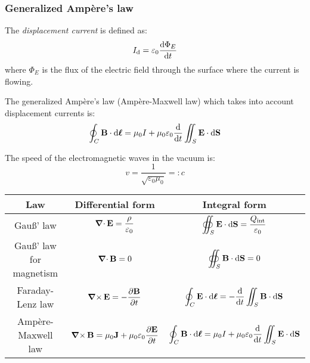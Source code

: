 \documentclass[../../../main_physics.tex]{subfiles}
\begin{document}
\begin{multicols}{2}
  \subsubsection{Generalized Ampère's law}
  \begin{definition}
    The \emph{displacement current} is defined as: $$I_\text{d}=\varepsilon_0\dv{\Phi_E}{t}$$ where $\Phi_E$ is the flux of the electric field through the surface where the current is flowing.
  \end{definition}
  \begin{law}
    The generalized Ampère's law (Ampère-Maxwell law) which takes into account displacement currents is: $$\oint_C\boldsymbol{\mathrm{B}}\cdot \dd{\boldsymbol{\mathrm{\ell}}}=\mu_0 I+\mu_0\varepsilon_0\dv{}{t}\iint_S\boldsymbol{\mathrm{E}}\cdot \dd{\boldsymbol{\mathrm{S}}}$$
  \end{law}
  \begin{definition}
    The speed of the electromagnetic waves in the vacuum is: $$v=\frac{1}{\sqrt{\varepsilon_0\mu_0}}=:c$$
  \end{definition}
\end{multicols}
\begin{table}[ht]
  \centering
  \renewcommand{\arraystretch}{2.5}
  \begin{tabular}{|c|c|c|}
    \hline
    \bfseries Law             & \bfseries Differential form                                                                 & \bfseries Integral form                                                                                            \\
    \hline
    Gau\ss' law               & $\displaystyle \operatorname{\boldsymbol{\mathrm{\nabla}}\cdot}\boldsymbol{\mathrm{E}}=\frac{\rho}{\varepsilon_0}$                                      & $\displaystyle \oiint_S\boldsymbol{\mathrm{E}}\cdot \dd{\boldsymbol{\mathrm{S}}}=\frac{Q_{\text{int}}}{\varepsilon_0}$                               \\
    \hline
    Gau\ss' law for magnetism & $\displaystyle \operatorname{\boldsymbol{\mathrm{\nabla}}\cdot}\boldsymbol{\mathrm{B}}=0$                                                               & $\displaystyle \oiint_S\boldsymbol{\mathrm{B}}\cdot \dd{\boldsymbol{\mathrm{S}}}=0$                                                                  \\
    \hline
    Faraday-Lenz law          & $\displaystyle \operatorname{\boldsymbol{\mathrm{\nabla}}\times}\boldsymbol{\mathrm{E}}=-\frac{\partial\boldsymbol{\mathrm{B}}}{\partial t}$                              & $\displaystyle \oint_C\boldsymbol{\mathrm{E}}\cdot \dd{\boldsymbol{\mathrm{\ell}}}=-\dv{}{t}\iint_S\boldsymbol{\mathrm{B}}\cdot \dd{\boldsymbol{\mathrm{S}}}$                          \\
    \hline
    Ampère-Maxwell law        & $\displaystyle \operatorname{\boldsymbol{\mathrm{\nabla}}\times}\boldsymbol{\mathrm{B}}=\mu_0\boldsymbol{\mathrm{J}}+\mu_0\varepsilon_0\frac{\partial\boldsymbol{\mathrm{E}}}{\partial t}$ & $\displaystyle \oint_C\boldsymbol{\mathrm{B}}\cdot \dd{\boldsymbol{\mathrm{\ell}}}=\mu_0 I+\mu_0\varepsilon_0\dv{}{t}\iint_S\boldsymbol{\mathrm{E}}\cdot \dd{\boldsymbol{\mathrm{S}}}$ \\
    \hline
  \end{tabular}
\end{table}
\end{document}
